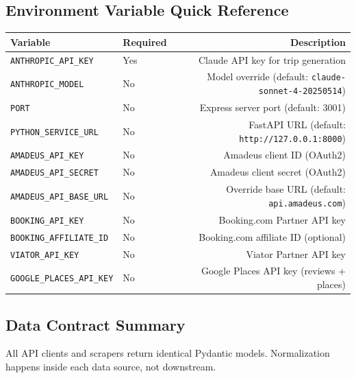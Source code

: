 \documentclass[11pt,a4paper]{article}
\begin{document}
\subsection{Environment Variable Quick Reference}

{\small
\begin{tabularx}{\textwidth}{@{}L{4.2cm}L{1.6cm}R@{}}
\toprule
\textbf{Variable} & \textbf{Required} & \textbf{Description} \\
\midrule
\texttt{ANTHROPIC\_API\_KEY} & Yes & Claude API key for trip generation \\[4pt]
\texttt{ANTHROPIC\_MODEL} & No & Model override (default: \texttt{claude-sonnet-4-20250514}) \\[4pt]
\texttt{PORT} & No & Express server port (default: 3001) \\[4pt]
\texttt{PYTHON\_SERVICE\_URL} & No & FastAPI URL (default: \texttt{http://127.0.0.1:8000}) \\
\midrule
\texttt{AMADEUS\_API\_KEY} & No & Amadeus client ID (OAuth2) \\[4pt]
\texttt{AMADEUS\_API\_SECRET} & No & Amadeus client secret (OAuth2) \\[4pt]
\texttt{AMADEUS\_API\_BASE\_URL} & No & Override base URL (default: \texttt{api.amadeus.com}) \\[4pt]
\texttt{BOOKING\_API\_KEY} & No & Booking.com Partner API key \\[4pt]
\texttt{BOOKING\_AFFILIATE\_ID} & No & Booking.com affiliate ID (optional) \\[4pt]
\texttt{VIATOR\_API\_KEY} & No & Viator Partner API key \\[4pt]
\texttt{GOOGLE\_PLACES\_API\_KEY} & No & Google Places API key (reviews + places) \\
\bottomrule
\end{tabularx}}

\subsection{Data Contract Summary}

All API clients and scrapers return identical Pydantic models. Normalization happens inside each data source, not downstream.
\end{document}

